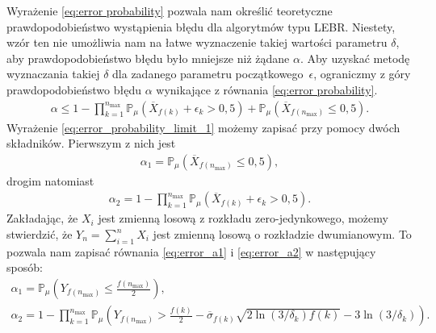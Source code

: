 \documentclass[inzynierska]{pwr_wmat_praca_dyplomowa}
\theoremstyle{plain}
\numberwithin{theorem}{chapter}
\theoremstyle{definition}
\numberwithin{theorem}{chapter}
\newcommand{\probP}{\mathbb{P}}
\newcommand{\nmax}{n_{\text{max}}}
\begin{document}
	Wyrażenie \eqref{eq:error probability} pozwala nam określić teoretyczne prawdopodobieństwo wystąpienia błędu dla algorytmów typu LEBR. Niestety, wzór ten nie umożliwia nam na łatwe wyznaczenie takiej wartości parametru $\delta$, aby prawdopodobieństwo błędu było mniejsze niż żądane $\alpha$. Aby uzyskać metodę wyznaczania takiej $\delta$ dla zadanego parametru początkowego~$\epsilon$, ograniczmy z góry prawdopodobieństwo błędu $\alpha$ wynikające z równania \eqref{eq:error probability}.
	\begin{gather}
		\label{eq:error_probability_limit_1}
		\alpha \le
		  1-\prod^{\nmax}_{k=1} \probP_{\mu}(\overline{X}_{f(k)} +  \epsilon_{k} > 0,5) +
		 \probP_{\mu}(\overline{X}_{f(\nmax)}\le 0,5).
	\end{gather}
	\noindent
	Wyrażenie \eqref{eq:error_probability_limit_1} możemy zapisać przy pomocy dwóch składników. Pierwszym z nich jest 
	\begin{gather}
		\alpha_1 = \label{eq:error_a1}
		\probP_{\mu}(\overline{X}_{f(\nmax)} \le 0,5),
	\end{gather}
	drogim natomiast
	\begin{gather}
		\label{eq:error_a2}
		\alpha_2 = 1 - \prod^{\nmax}_{k=1} \probP_{\mu}(\overline{X}_{f(k)} +  \epsilon_{k} > 0,5).
	\end{gather}
	Zakładając, że $X_i$ jest zmienną losową z rozkładu zero-jedynkowego, możemy stwierdzić, że $Y_n = \sum_{i=1}^{n}X_i$ jest zmienną losową o rozkładzie dwumianowym. To pozwala nam zapisać równania \eqref{eq:error_a1} i \eqref{eq:error_a2} w następujący sposób:
	\begin{gather}
		\label{eq:error_a1_1}
		\alpha_1 = \probP_{\mu}\left( Y_{f(\nmax)} \le  \frac{f(\nmax)}{2} \right),\nonumber \\
		\label{eq:error_a2_1}
		\alpha_2 = 1 - \prod_{k=1}^{\nmax} \probP_{\mu}\left( Y_{f(\nmax)}  > \frac{f(k)}{2} - \overline{\sigma}_{f(k)} \sqrt{2\ln(3/\delta_k)f(k)} - 3  \ln{(3 / \delta_k)} \right).
	\end{gather}
	
\end{document}
